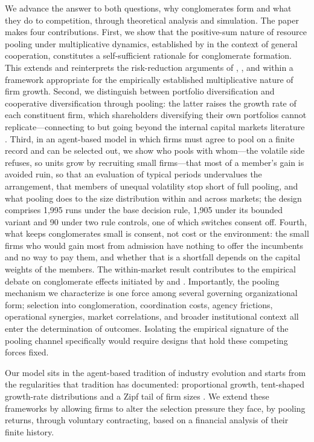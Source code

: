\documentclass[12pt,a4paper]{article}
\begin{document}
We advance the answer to both questions, why conglomerates form and what they do to competition, through theoretical analysis and simulation. The paper makes four contributions. First, we show that the positive-sum nature of resource pooling under multiplicative dynamics, established by \textcite{peters2022ergodicity} in the context of general cooperation, constitutes a self-sufficient rationale for conglomerate formation. This extends and reinterprets the risk-reduction arguments of \textcite{amihud1981risk}, \textcite{lewellen1971pure}, and \textcite{mueller1969theory} within a framework appropriate for the empirically established multiplicative nature of firm growth. Second, we distinguish between portfolio diversification and cooperative diversification through pooling: the latter raises the growth rate of each constituent firm, which shareholders diversifying their own portfolios cannot replicate---connecting to but going beyond the internal capital markets literature \parencite{stein1997internal, gertner1994internal}. Third, in an agent-based model in which firms must agree to pool on a finite record and can be selected out, we show who pools with whom---the volatile side refuses, so units grow by recruiting small firms---that most of a member's gain is avoided ruin, so that an evaluation of typical periods undervalues the arrangement, that members of unequal volatility stop short of full pooling, and what pooling does to the size distribution within and across markets; the design comprises 1,995 runs under the base decision rule, 1,905 under its bounded variant and 90 under two rule controls, one of which switches consent off. Fourth, what keeps conglomerates small is consent, not cost or the environment: the small firms who would gain most from admission have nothing to offer the incumbents and no way to pay them, and whether that is a shortfall depends on the capital weights of the members. The within-market result contributes to the empirical debate on conglomerate effects initiated by \textcite{goldberg1973effect} and \textcite{waldman1983impact}. Importantly, the pooling mechanism we characterize is one force among several governing organizational form; selection into conglomeration, coordination costs, agency frictions, operational synergies, market correlations, and broader institutional context all enter the determination of outcomes. Isolating the empirical signature of the pooling channel specifically would require designs that hold these competing forces fixed.

Our model sits in the agent-based tradition of industry evolution \parencite{nelson1982schumpeterian, winter2003baseline} and starts from the regularities that tradition has documented: proportional growth, tent-shaped growth-rate distributions and a Zipf tail of firm sizes \parencite{stanley1996scaling,bottazzi2006explaining,axtell2001zipf,dosi2017footprint,coad2009growth}. We extend these frameworks by allowing firms to alter the selection pressure they face, by pooling returns, through voluntary contracting, based on a financial analysis of their finite history.
\end{document}

